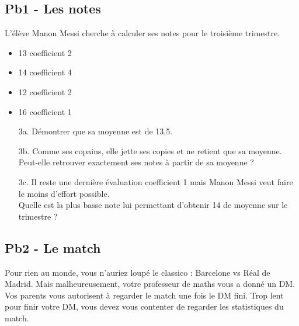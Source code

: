 \begin{multicols}{2}

\subsection*{Pb1 - Les notes}

L'élève Manon Messi cherche à calculer ses notes pour le troisième trimestre.

\begin{itemize}[label={$\bullet$}]
  \item 13 coefficient 2
  \item 14 coefficient 4
  \item 12 coefficient 2
  \item 16 coefficient 1
\end{itemize} 

\begin{enumerate}
  \item[3a.] Démontrer que sa moyenne est de 13,5.
  \item[3b.] Comme ses copains, elle jette ses copies et ne retient que sa moyenne. \\
  Peut-elle retrouver exactement ses notes à partir de sa moyenne ? 
  \item[3c.] Il reste une dernière évaluation coefficient 1 mais Manon Messi veut faire le moins d'effort possible. \\
  Quelle est la plus basse note lui permettant d'obtenir 14 de moyenne sur le trimestre ?
\end{enumerate} 

\columnbreak

\Pointilles[18]

\end{multicols}

\subsection*{Pb2 - Le match}

Pour rien au monde, vous n'auriez loupé le classico : Barcelone vs Réal de Madrid. Mais malheureusement, votre professeur de maths vous a donné un DM. Vos parents vous autorisent à regarder le match une fois le DM fini. Trop lent pour finir votre DM, vous devez vous contenter de regarder les statistiques du match. 

